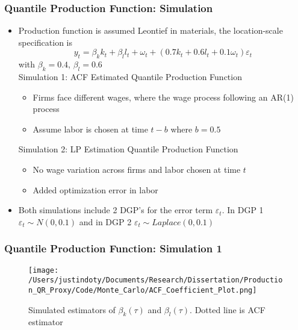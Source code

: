 \documentclass{beamer}
\begin{document}

\begin{frame}
\frametitle{Quantile Production Function: Simulation}
\begin{itemize}
	\item Production function is assumed Leontief in materials, the location-scale specification is
	\begin{equation}
		y_{t}=\beta_{k}k_{t}+\beta_{l}l_{t}+\omega_{t}+(0.7k_{t}+0.6l_{t}+0.1\omega_{t})\varepsilon_{t}
	\end{equation}
	with $\beta_{k}=0.4$, $\beta_{l}=0.6$\\
	
	Simulation 1: ACF Estimated Quantile Production Function
	\begin{itemize}
		\item Firms face different wages, where the wage process following an AR(1) process
		\item Assume labor is chosen at time $t-b$ where $b=0.5$
	\end{itemize}
	
	Simulation 2: LP Estimation Quantile Production Function
	\begin{itemize}
		\item No wage variation across firms and labor chosen at time $t$
		\item Added optimization error in labor
	\end{itemize}
	
	\item Both simulations include 2 DGP's for the error term $\varepsilon_{t}$. In DGP 1 $\varepsilon_{t} \sim N(0,0.1)$ and in DGP 2 $\varepsilon_{t} \sim \textit{Laplace}(0,0.1)$
\end{itemize}
\end{frame}


\begin{frame}
\frametitle{Quantile Production Function: Simulation 1}
\begin{figure}[H]
\centering
\caption{Simulated estimators of $\beta_{k}(\tau)$ and $\beta_{l}(\tau)$. Dotted line is ACF estimator}
\texttt{[image: /Users/justindoty/Documents/Research/Dissertation/Production\_QR\_Proxy/Code/Monte\_Carlo/ACF\_Coefficient\_Plot.png]}
\end{figure}
\end{frame}
\end{document}
